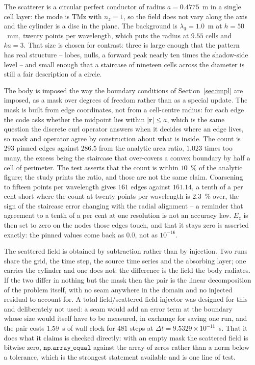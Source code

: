 The scatterer is a circular perfect conductor of radius $a=0.4775$~m in a single cell layer: the mode is TMz
with $n_z=1$, so the field does not vary along the axis and the cylinder is a disc in the plane. The
background is $\lambda_0=1.0$~m at $h=50$~mm, twenty points per wavelength, which puts the radius at $9.55$
cells and $ka=3$. That size is chosen for contrast: three is large enough that the pattern has real
structure -- lobes, nulls, a forward peak nearly ten times the shadow-side level -- and small enough that a
staircase of nineteen cells across the diameter is still a fair description of a circle.

The body is imposed the way the boundary conditions of Section~\ref{sec:impl} are imposed, as a mask over
degrees of freedom rather than as a special update. The mask is built from edge coordinates, not from a
cell-centre radius: for each edge the code asks whether the midpoint lies within $|\mathbf{r}|\le a$, which is
the same question the discrete curl operator answers when it decides where an edge lives, so mask and
operator agree by construction about what is inside. The count is $293$ pinned edges against $286.5$ from the
analytic area ratio, $1.023$ times too many, the excess being the staircase that over-covers a convex
boundary by half a cell of perimeter. The test asserts that the count is within $10$~\% of the analytic
figure; the study prints the ratio, and those are not the same claim. Coarsening to fifteen points per
wavelength gives $161$ edges against $161.14$, a tenth of a per cent short where the count at twenty points
per wavelength is $2.3$~\% over, the sign of the staircase error changing with the radial alignment -- a
reminder that agreement to a tenth of a per cent at one resolution is not an accuracy law. $E_z$ is then set
to zero on the nodes those edges touch, and that it stays zero is asserted exactly: the pinned values come
back as $0.0$, not as $10^{-16}$.

The scattered field is obtained by subtraction rather than by injection. Two runs share the grid, the time
step, the source time series and the absorbing layer; one carries the cylinder and one does not; the
difference is the field the body radiates. If the two differ in nothing but the mask then the pair is the
linear decomposition of the problem itself, with no seam anywhere in the domain and no injected residual to
account for. A total-field/scattered-field injector was designed for this and deliberately not used: a seam
would add an error term at the boundary whose size would itself have to be measured, in exchange for saving
one run, and the pair costs \SI{1.59}{s} of wall clock for $481$ steps at
$\Delta t=9.5329\times10^{-11}$~s. That it does what it claims is checked directly: with an empty mask the
scattered field is bitwise zero, $\mathtt{np.array\_equal}$ against the array of zeros rather than a norm
below a tolerance, which is the strongest statement available and is one line of test.

